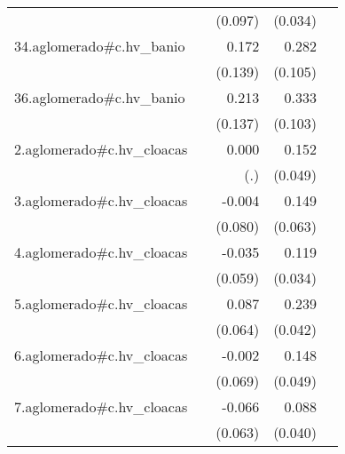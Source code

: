 {\begin{longtable}{l*{4}{D{.}{.}{-1}}}
            &                     &     (0.097)         &     (0.034)         &                     \\
\addlinespace
34.aglomerado#c.hv\_banio&                     &       0.172         &       0.282\sym{**} &                     \\
            &                     &     (0.139)         &     (0.105)         &                     \\
\addlinespace
36.aglomerado#c.hv\_banio&                     &       0.213         &       0.333\sym{**} &                     \\
            &                     &     (0.137)         &     (0.103)         &                     \\
\addlinespace
2.aglomerado#c.hv\_cloacas&                     &       0.000         &       0.152\sym{**} &                     \\
            &                     &         (.)         &     (0.049)         &                     \\
\addlinespace
3.aglomerado#c.hv\_cloacas&                     &      -0.004         &       0.149\sym{*}  &                     \\
            &                     &     (0.080)         &     (0.063)         &                     \\
\addlinespace
4.aglomerado#c.hv\_cloacas&                     &      -0.035         &       0.119\sym{***}&                     \\
            &                     &     (0.059)         &     (0.034)         &                     \\
\addlinespace
5.aglomerado#c.hv\_cloacas&                     &       0.087         &       0.239\sym{***}&                     \\
            &                     &     (0.064)         &     (0.042)         &                     \\
\addlinespace
6.aglomerado#c.hv\_cloacas&                     &      -0.002         &       0.148\sym{**} &                     \\
            &                     &     (0.069)         &     (0.049)         &                     \\
\addlinespace
7.aglomerado#c.hv\_cloacas&                     &      -0.066         &       0.088\sym{*}  &                     \\
            &                     &     (0.063)         &     (0.040)         &                     \\

\end{longtable}}
